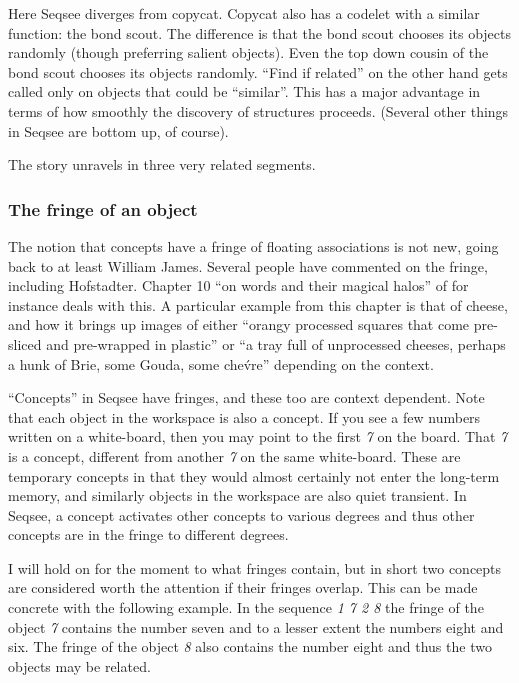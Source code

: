 Here Seqsee diverges from copycat.  Copycat also has a codelet with a similar function: the bond scout.  The difference is that the bond scout chooses its objects randomly (though preferring salient objects).  Even the top down cousin of the bond scout chooses its objects randomly.  ``Find if related'' on the other hand gets called only on objects that could be ``similar''.  This has a major advantage in terms of how smoothly the discovery of structures proceeds.  (Several other things in Seqsee are bottom up, of course).

The story unravels in three very related segments.

\subsubsection{The fringe of an object}

The notion that concepts have a fringe of floating associations is not new, going back to at least William James.  Several people have commented on the fringe, including Hofstadter.  Chapter 10 ``on words and their magical halos'' of \cite{Hofstadter:LeTon} for instance deals with this.  A particular example from this chapter is that of cheese, and how it brings up images of either ``orangy processed squares that come pre-sliced and pre-wrapped in plastic'' or ``a tray full of unprocessed cheeses, perhaps a hunk of Brie, some Gouda, some che\'vre'' depending on the context.

``Concepts'' in Seqsee have fringes, and these too are context dependent.  Note that each object in the workspace is also a concept.  If you see a few numbers written on a white-board, then you may point to the first \emph{7} on the board.  That \emph{7} is a concept, different from another \emph{7} on the same white-board.  These are temporary concepts in that they would almost certainly not enter the long-term memory, and similarly objects in the workspace are also quiet transient.  In Seqsee, a concept activates other concepts to various degrees and thus other concepts are in the fringe to different degrees.

I will hold on for the moment to what fringes contain, but in short two concepts are considered worth the attention if their fringes overlap.  This can be made concrete with the following example.  In the sequence \emph{1 7 2 8} the fringe of the object \emph{7} contains the number seven and to a lesser extent the numbers eight and six.  The fringe of the object \emph{8} also contains the number eight and thus the two objects may be related.

